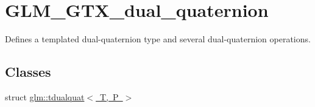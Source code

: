 \hypertarget{group__gtx__dual__quaternion}{}\section{G\+L\+M\+\_\+\+G\+T\+X\+\_\+dual\+\_\+quaternion}
\label{group__gtx__dual__quaternion}


Defines a templated dual-\/quaternion type and several dual-\/quaternion operations.  


\subsection*{Classes}
\begin{DoxyCompactItemize}
\item 
struct \mbox{\hyperlink{structglm_1_1tdualquat}{glm\+::tdualquat$<$ T, P $>$}}
\end{DoxyCompactItemize}
